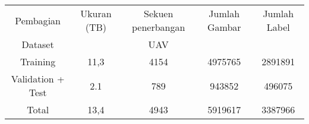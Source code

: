
\begin{table}[H]
  \centering
  \label{tbl:datasettraintest}
  \begin{tabular}{|c|c|c|c|c|}
    \hline
    Pembagian & Ukuran (TB) & Sekuen penerbangan & Jumlah Gambar & Jumlah Label\\
    Dataset &  & UAV &  & \\
    \hline
    Training & 11,3 & 4154 & 4975765 & 2891891\\
    \hline
    Validation + Test &2.1 &789 & 943852 & 496075\\
    \hline
    Total &13,4 &4943 & 5919617 & 3387966\\
    \hline
  \end{tabular}
\end{table}